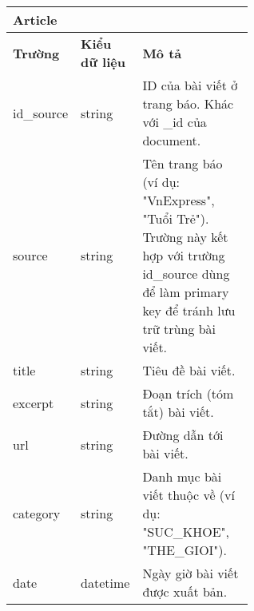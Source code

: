 \begin{table}[ht!]
    \centering
\begin{tabular}{|llp{0.6\linewidth}|}
\hline
\multicolumn{3}{|l|}{\textbf{Article}}                                                                                                                                                                                                       \\ \hline
\multicolumn{1}{|l|}{\textbf{Trường}} & \multicolumn{1}{l|}{\textbf{Kiểu dữ liệu}} & \textbf{Mô   tả}                                                                                                                                        \\ \hline
\multicolumn{1}{|l|}{id\_source}      & \multicolumn{1}{l|}{string}                & ID   của bài viết ở trang báo. Khác với \_id của document.                                                                                              \\ \hline
\multicolumn{1}{|l|}{source}          & \multicolumn{1}{l|}{string}                & Tên   trang báo (ví dụ: "VnExpress", "Tuổi Trẻ"). Trường này   kết hợp với trường id\_source dùng để làm primary key để tránh lưu trữ trùng   bài viết. \\ \hline
\multicolumn{1}{|l|}{title}           & \multicolumn{1}{l|}{string}                & Tiêu   đề bài viết.                                                                                                                                     \\ \hline
\multicolumn{1}{|l|}{excerpt}         & \multicolumn{1}{l|}{string}                & Đoạn   trích (tóm tắt) bài viết.                                                                                                                        \\ \hline
\multicolumn{1}{|l|}{url}             & \multicolumn{1}{l|}{string}                & Đường   dẫn tới bài viết.                                                                                                                               \\ \hline
\multicolumn{1}{|l|}{category}        & \multicolumn{1}{l|}{string}                & Danh   mục bài viết thuộc về (ví dụ: "SUC\_KHOE", "THE\_GIOI").                                                                                         \\ \hline
\multicolumn{1}{|l|}{date}            & \multicolumn{1}{l|}{datetime}              & Ngày   giờ bài viết được xuất bản.                                                                                                                      \\ \hline

\end{tabular}
\end{table}
